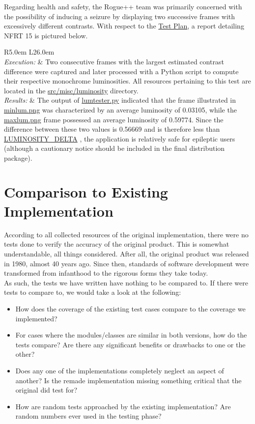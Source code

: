 \documentclass[12pt, titlepage]{article}
\newcommand{\newsection}[1]{
  \newpage
  \section{#1}
}
\newcommand{\nfrtc}[3]{
	\begin{table}[H]
		\centering
		\def\arraystretch{1.6}
		\begin{tabular}{ R{5.0em} L{26.0em} }
			\bottomrule
			\multicolumn{2}{ c }{\textbf{Non-Functional Requirement Test} \# #1 \textbf{Report}}  \\
			\hline
			\textit{Execution:} & #2 \\
			\textit{Results:} & #3 \\
			\toprule
		\end{tabular}
	\end{table}
}
\newcommand{\tplink}[1]{
	 \href{run:../TestPlan/TestPlan.pdf}{#1}
}
\begin{document}
		Regarding health and safety, the Rogue++ team was primarily concerned with the possibility of inducing a seizure by displaying two successive frames with excessively different contrasts.  With respect to the \href{run:../TestPlan/TestPlan.pdf}{Test Plan}, a report detailing NFRT 15 is pictured below.

	\nfrtc {15}
			{Two consecutive frames with the largest estimated contrast difference were captured and later processed with a Python script to compute their respective monochrome luminosities.  All resources pertaining to this test are located in the \href{run:../../src/misc/luminosity}{src/misc/luminosity} directory.}
			{The output of \href{run:../../src/misc/luminosity/lumtester.py}{lumtester.py} indicated that the frame illustrated in \href{run:../../src/misc/luminosity/minlum.png}{minlum.png} was characterized by an average luminosity of 0.03105, while the \href{run:../../src/misc/luminosity/maxlum.png}{maxlum.png} frame possessed an average luminosity of 0.59774.  Since the difference between these two values is 0.56669 and is therefore less than \tplink{LUMINOSITY\_DELTA}, the application is relatively safe for epileptic users (although a cautionary notice should be included in the final distribution package).}

\newsection{Comparison to Existing Implementation} \label{Section_Comparison}

	According to all collected resources of the original implementation, there were no tests done to verify the accuracy of the original product. This is somewhat understandable, all things considered. After all, the original product was released in 1980, almost 40 years ago. Since then, standards of software development were transformed from infanthood to the rigorous forms they take today.\\

	As such, the tests we have written have nothing to be compared to. If there were tests to compare to, we would take a look at the following:\\

	\begin{itemize}
		\item How does the coverage of the existing test cases compare to the coverage we implemented?
		\item For cases where the modules/classes are similar in both versions, how do the tests compare? Are there any significant benefits or drawbacks to one or the other?
		\item Does any one of the implementations completely neglect an aspect of another? Is the remade implementation missing something critical that the original did test for?
		\item How are random tests approached by the existing implementation? Are random numbers ever used in the testing phase?
	\end{itemize}
\end{document}
